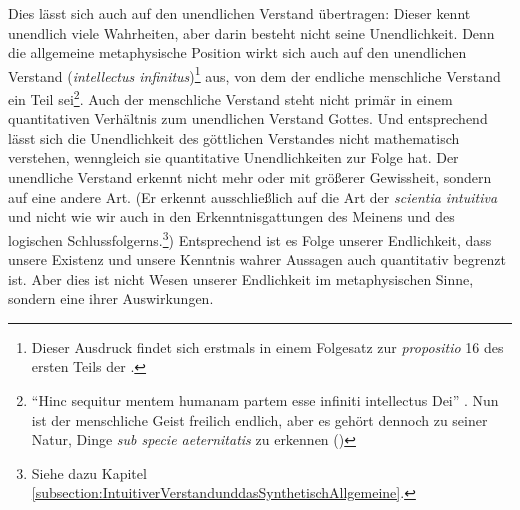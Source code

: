 Dies lässt sich auch auf den unendlichen Verstand übertragen:
Dieser kennt unendlich viele Wahrheiten, aber darin besteht nicht seine
Unendlichkeit. Denn die allgemeine metaphysische Position wirkt sich auch auf
den unendlichen Verstand (\emph{intellectus infinitus})\footnote{Dieser Ausdruck
findet sich erstmals in einem Folgesatz zur
\emph{propositio} 16 des ersten Teils der 
\parencite[siehe][1p16c1]{Spinoza:EthikingeometrischerOrdnungdargestellt2007}.}
aus, von dem der endliche menschliche Verstand ein Teil sei\footnote{\enquote{Hinc
sequitur mentem humanam partem esse infiniti intellectus Dei}
\parencite[][2p11c]{Spinoza:EthikingeometrischerOrdnungdargestellt2007}. Nun ist
der menschliche Geist freilich endlich, aber es gehört dennoch zu seiner Natur,
Dinge \emph{sub specie aeternitatis} zu erkennen
\mkbibparens{\cite[Vgl.][2p44c2]{Spinoza:EthikingeometrischerOrdnungdargestellt2007}}}.
Auch der menschliche Verstand steht nicht primär in einem quantitativen
Verhältnis zum unendlichen Verstand Gottes. Und entsprechend lässt sich die Unendlichkeit des
göttlichen Verstandes nicht mathematisch verstehen, wenngleich sie quantitative
Unendlichkeiten zur Folge hat. Der unendliche Verstand erkennt nicht mehr oder
mit größerer Gewissheit, sondern auf eine andere Art. (Er erkennt
ausschließlich auf die Art der \emph{scientia intuitiva} und nicht wie wir auch
in den Erkenntnisgattungen des Meinens und des logischen
Schlussfolgerns.\footnote{Siehe dazu Kapitel
\ref{subsection:IntuitiverVerstandunddasSynthetischAllgemeine}.}) Entsprechend
ist es Folge unserer Endlichkeit, dass unsere Existenz und unsere Kenntnis
wahrer Aussagen auch quantitativ begrenzt ist. Aber dies ist nicht Wesen unserer
Endlichkeit im metaphysischen Sinne, sondern eine ihrer Auswirkungen.

